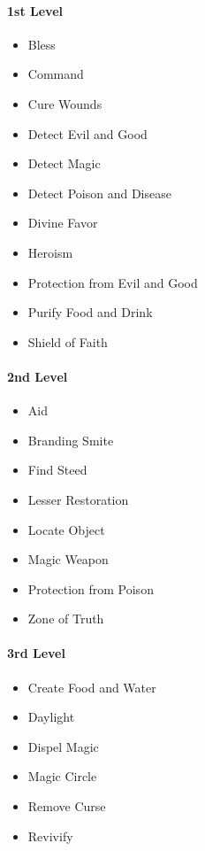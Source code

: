 \paragraph{1st Level}\label{_1st_level}

\begin{itemize}
\item
  Bless
\item
  Command
\item
  Cure Wounds
\item
  Detect Evil and Good
\item
  Detect Magic
\item
  Detect Poison and Disease
\item
  Divine Favor
\item
  Heroism
\item
  Protection from Evil and Good
\item
  Purify Food and Drink
\item
  Shield of Faith
\end{itemize}

\paragraph{2nd Level}\label{_2nd_level}

\begin{itemize}
\item
  Aid
\item
  Branding Smite
\item
  Find Steed
\item
  Lesser Restoration
\item
  Locate Object
\item
  Magic Weapon
\item
  Protection from Poison
\item
  Zone of Truth
\end{itemize}

\paragraph{3rd Level}\label{_3rd_level}

\begin{itemize}
\item
  Create Food and Water
\item
  Daylight
\item
  Dispel Magic
\item
  Magic Circle
\item
  Remove Curse
\item
  Revivify
\end{itemize}

